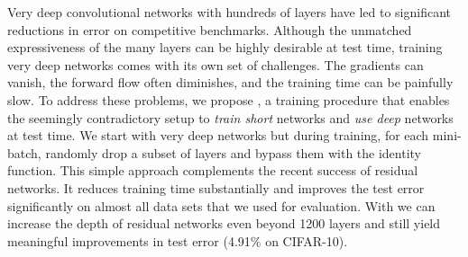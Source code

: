 Very deep convolutional networks with hundreds of layers have led to significant reductions in error on competitive benchmarks. Although the unmatched expressiveness of the many layers can be highly desirable at test time, training very deep networks comes with its own set of challenges. The gradients can vanish, the forward flow often diminishes, and the training time can be painfully slow. To address these problems, we propose \emph{\name{}}, a training procedure that enables the seemingly contradictory setup to \emph{train short} networks and \emph{use deep} networks at test time. We start with very deep networks but during training, for each mini-batch, randomly drop a subset of layers and bypass them with the identity function. This simple approach complements the recent success of residual networks. It reduces training time substantially and improves the test error significantly on almost all data sets that we used for evaluation. With \name{} we can increase the depth of residual networks even beyond 1200 layers and still yield meaningful improvements in test error (4.91\% on CIFAR-10).